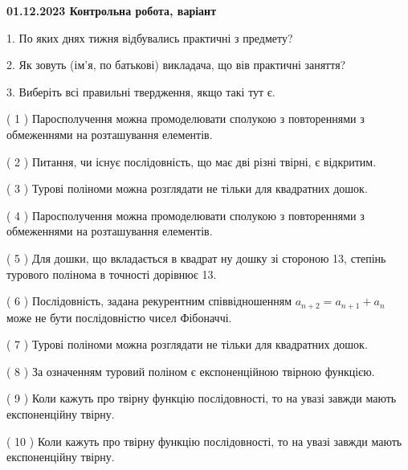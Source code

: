 \documentclass[12pt, ukrainian]{article}
\begin{document}
\vspace{4mm}
\newpage
\begin {large}

\textbf{01.12.2023 Контрольна робота, варіант  }\par


{
1. По яких днях тижня відбувались практичні з предмету?



\vspace{5mm}
2. Як зовуть (ім'я, по батькові) викладача, що вів практичні заняття?



\vspace{5mm}
3. Виберіть всі правильні твердження, якщо такі тут є.\par
\vspace{2mm}
( 1 ) Паросполучення можна промоделювати сполукою з повтореннями з обмеженнями на розташування елементів.%

( 2 ) Питання, чи існує послідовність, що має дві різні твірні, є відкритим.%

( 3 ) Турові поліноми можна розглядати не тільки для квадратних дошок.%

( 4 ) Паросполучення можна промоделювати сполукою з повтореннями з обмеженнями на розташування елементів.%

( 5 ) Для дошки, що вкладається в квадрат ну дошку зі стороною 13, степінь турового полінома в точності дорівнює 13.%

( 6 ) Послідовність, задана рекурентним співвідношенням $a_{n+2}=a_{n+1}+a_{n}$ може не бути послідовністю чисел Фібоначчі.%

( 7 ) Турові поліноми можна розглядати не тільки для квадратних дошок.%

( 8 ) За означенням туровий поліном є експоненційною твірною функцією.%

( 9 ) Коли кажуть про твірну функцію послідовності, то на увазі завжди мають експоненційну твірну.%

( 10 ) Коли кажуть про твірну функцію послідовності, то на увазі завжди мають експоненційну твірну.%
}
\end {large}
\end{document}
